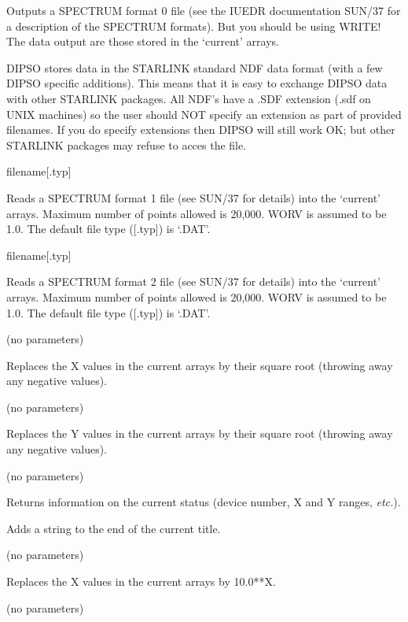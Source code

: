 \begin {description}
Outputs a SPECTRUM format 0 file (see the IUEDR documentation SUN/37
for a description of the SPECTRUM formats). But you should be using
WRITE! The data output are those stored in the `current' arrays.

DIPSO stores data in the STARLINK standard NDF data format (with a few
DIPSO specific additions). This means that it is easy to exchange
DIPSO data with other STARLINK packages. All NDF's have a .SDF
extension (.sdf on UNIX machines) so the user should NOT specify an
extension as part of provided filenames. If you do specify extensions
then DIPSO will still work OK; but other STARLINK packages may refuse
to acces the file.

\item [SP1RD] filename[.typ]

Reads a SPECTRUM format 1 file (see SUN/37 for details) into the
`current' arrays. Maximum number of points allowed is 20,000. WORV is
assumed to be 1.0. The default file type ([.typ]) is `.DAT'.

\item [SP2RD] filename[.typ]

Reads a SPECTRUM format 2 file (see SUN/37 for details) into the
`current' arrays. Maximum number of points allowed is 20,000. WORV is
assumed to be 1.0. The default file type ([.typ]) is `.DAT'.

\item [SQRTX] (no parameters)

Replaces the X values in the current arrays by their square root
(throwing away any negative values).

\item [SQRTY] (no parameters)

Replaces the Y values in the current arrays by their square root
(throwing away any negative values).

\item [STATUS] (no parameters)

Returns information on the current status (device number, X and Y
ranges, {\em etc.}).

\item [TADD] [string]

Adds a string to the end of the current title.

\item [TENX] (no parameters)

Replaces the X values in the current arrays by 10.0**X.

\item [TENY] (no parameters)


\end{description}
